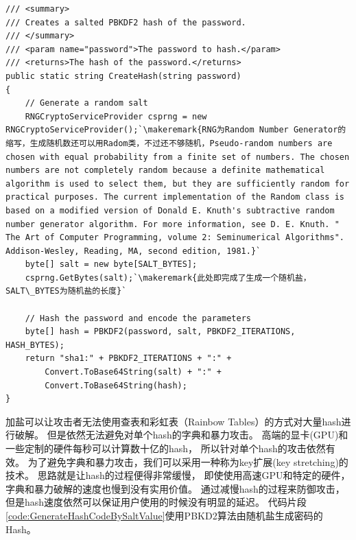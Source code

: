 \documentclass{book}
\newcounter{coderemarks}   %
\newcounter{codevar}     %
\newcommand{\circlemark}[1]{%
\tikz\node[text=white,font=\sffamily\bfseries,inner sep=0.2mm,draw,circle,fill=black]{#1};}
\newcommand{\makeremark}[1]{%
\circlemark{\arabic{coderemarks}}%
\global \expandafter\def \csname codebox\the\value{coderemarks}\endcsname{#1}%
\stepcounter{coderemarks}}
\newcommand{\showremarks}{%
\begin{list}{\circlemark{\arabic{codevar}}} %
{} %
\whiledo{\value{codevar} < \value{coderemarks}}{ %
\item \expandafter\csname codebox\the\value{codevar}\endcsname %
\stepcounter{codevar}} %
\end{list} %
\setcounter{coderemarks}{1}%
\setcounter{codevar}{1}%
}
\begin{document}
\begin{lstlisting}[language={[Sharp]C},caption=生成随机盐,label={code:GenerateRandomSaltValue}]
/// <summary>
/// Creates a salted PBKDF2 hash of the password.
/// </summary>
/// <param name="password">The password to hash.</param>
/// <returns>The hash of the password.</returns>
public static string CreateHash(string password)
{
    // Generate a random salt
    RNGCryptoServiceProvider csprng = new RNGCryptoServiceProvider();`\makeremark{RNG为Random Number Generator的缩写，生成随机数还可以用Radom类，不过还不够随机，Pseudo-random numbers are chosen with equal probability from a finite set of numbers. The chosen numbers are not completely random because a definite mathematical algorithm is used to select them, but they are sufficiently random for practical purposes. The current implementation of the Random class is based on a modified version of Donald E. Knuth's subtractive random number generator algorithm. For more information, see D. E. Knuth. " The Art of Computer Programming, volume 2: Seminumerical Algorithms". Addison-Wesley, Reading, MA, second edition, 1981.}`
    byte[] salt = new byte[SALT_BYTES];
    csprng.GetBytes(salt);`\makeremark{此处即完成了生成一个随机盐，SALT\_BYTES为随机盐的长度}`

    // Hash the password and encode the parameters
    byte[] hash = PBKDF2(password, salt, PBKDF2_ITERATIONS, HASH_BYTES);
    return "sha1:" + PBKDF2_ITERATIONS + ":" +
        Convert.ToBase64String(salt) + ":" +
        Convert.ToBase64String(hash);
}
\end{lstlisting}

\showremarks

加盐可以让攻击者无法使用查表和彩虹表（Rainbow Tables）的方式对大量hash进行破解。
但是依然无法避免对单个hash的字典和暴力攻击。
高端的显卡(GPU)和一些定制的硬件每秒可以计算数十亿的hash，
所以针对单个hash的攻击依然有效。
为了避免字典和暴力攻击，我们可以采用一种称为key扩展(key stretching)的技术。
思路就是让hash的过程便得非常缓慢，
即使使用高速GPU和特定的硬件，字典和暴力破解的速度也慢到没有实用价值。
通过减慢hash的过程来防御攻击，但是hash速度依然可以保证用户使用的时候没有明显的延迟。
代码片段\ref{code:GenerateHashCodeBySaltValue}使用PBKD2算法由随机盐生成密码的Hash。
\end{document}

